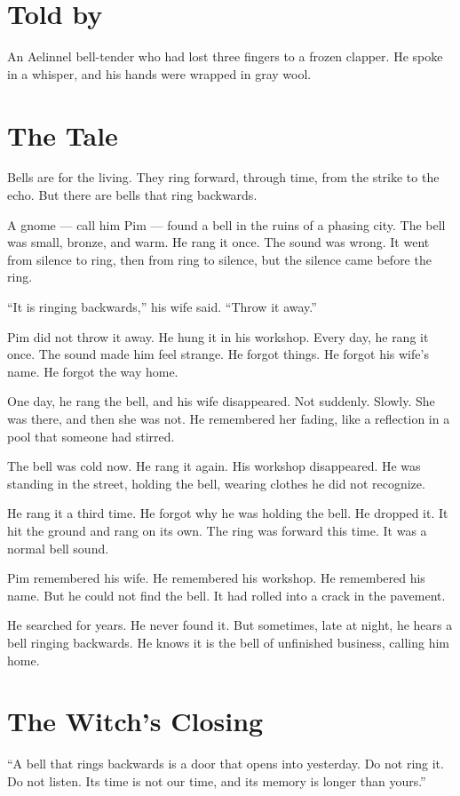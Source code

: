\documentclass[10pt,twoside]{book}
\begin{document}
\section*{Told by}
An Aelinnel bell-tender who had lost three fingers to a frozen clapper. He spoke in a whisper, and his hands were wrapped in gray wool.

\section*{The Tale}
Bells are for the living. They ring forward, through time, from the strike to the echo. But there are bells that ring backwards.

A gnome --- call him Pim --- found a bell in the ruins of a phasing city. The bell was small, bronze, and warm. He rang it once. The sound was wrong. It went from silence to ring, then from ring to silence, but the silence came before the ring.

``It is ringing backwards,'' his wife said. ``Throw it away.''

Pim did not throw it away. He hung it in his workshop. Every day, he rang it once. The sound made him feel strange. He forgot things. He forgot his wife's name. He forgot the way home.

One day, he rang the bell, and his wife disappeared. Not suddenly. Slowly. She was there, and then she was not. He remembered her fading, like a reflection in a pool that someone had stirred.

The bell was cold now. He rang it again. His workshop disappeared. He was standing in the street, holding the bell, wearing clothes he did not recognize.

He rang it a third time. He forgot why he was holding the bell. He dropped it. It hit the ground and rang on its own. The ring was forward this time. It was a normal bell sound.

Pim remembered his wife. He remembered his workshop. He remembered his name. But he could not find the bell. It had rolled into a crack in the pavement.

He searched for years. He never found it. But sometimes, late at night, he hears a bell ringing backwards. He knows it is the bell of unfinished business, calling him home.

\section*{The Witch's Closing}
``A bell that rings backwards is a door that opens into yesterday. Do not ring it. Do not listen. Its time is not our time, and its memory is longer than yours.''
\end{document}
